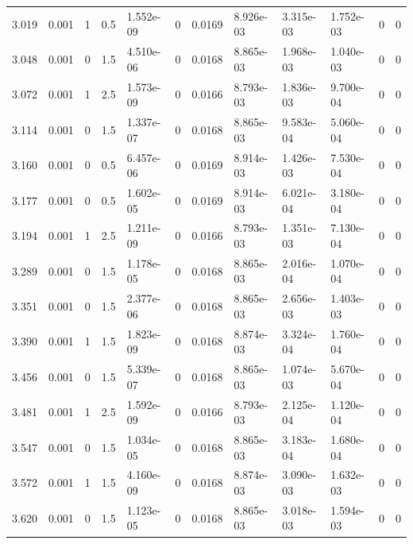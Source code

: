 \documentclass[preview]{standalone}
\begin{document}
{{{\begin{tabular}{L{1.2cm}C{1.2cm} C{0.3cm}C{0.5cm} C{1.4cm}C{1.4cm} C{1.4cm}C{1.4cm} C{1.6cm}C{1.6cm} C{1.6cm}C{1.6cm}}
  3.019  &  0.001  & 1     & 0.5 &  1.552e-09  & 0  &  0.0169&   8.926e-03& 3.315e-03 & 1.752e-03   &  0 & 0  \\ 
  3.048  &  0.001  & 0     & 1.5 &  4.510e-06  & 0  &  0.0168&   8.865e-03& 1.968e-03 & 1.040e-03   &  0 & 0  \\ 
  3.072  &  0.001  & 1     & 2.5 &  1.573e-09  & 0  &  0.0166&   8.793e-03& 1.836e-03 & 9.700e-04   &  0 & 0  \\ 
  3.114  &  0.001  & 0     & 1.5 &  1.337e-07  & 0  &  0.0168&   8.865e-03& 9.583e-04 & 5.060e-04   &  0 & 0  \\ 
  3.160  &  0.001  & 0     & 0.5 &  6.457e-06  & 0  &  0.0169&   8.914e-03& 1.426e-03 & 7.530e-04   &  0 & 0  \\ 
  3.177  &  0.001  & 0     & 0.5 &  1.602e-05  & 0  &  0.0169&   8.914e-03& 6.021e-04 & 3.180e-04   &  0 & 0  \\ 
  3.194  &  0.001  & 1     & 2.5 &  1.211e-09  & 0  &  0.0166&   8.793e-03& 1.351e-03 & 7.130e-04   &  0 & 0  \\ 
  3.289  &  0.001  & 0     & 1.5 &  1.178e-05  & 0  &  0.0168&   8.865e-03& 2.016e-04 & 1.070e-04   &  0 & 0  \\ 
  3.351  &  0.001  & 0     & 1.5 &  2.377e-06  & 0  &  0.0168&   8.865e-03& 2.656e-03 & 1.403e-03   &  0 & 0  \\ 
  3.390  &  0.001  & 1     & 1.5 &  1.823e-09  & 0  &  0.0168&   8.874e-03& 3.324e-04 & 1.760e-04   &  0 & 0  \\ 
  3.456  &  0.001  & 0     & 1.5 &  5.339e-07  & 0  &  0.0168&   8.865e-03& 1.074e-03 & 5.670e-04   &  0 & 0  \\ 
  3.481  &  0.001  & 1     & 2.5 &  1.592e-09  & 0  &  0.0166&   8.793e-03& 2.125e-04 & 1.120e-04   &  0 & 0  \\ 
  3.547  &  0.001  & 0     & 1.5 &  1.034e-05  & 0  &  0.0168&   8.865e-03& 3.183e-04 & 1.680e-04   &  0 & 0  \\ 
  3.572  &  0.001  & 1     & 1.5 &  4.160e-09  & 0  &  0.0168&   8.874e-03& 3.090e-03 & 1.632e-03   &  0 & 0  \\ 
  3.620  &  0.001  & 0     & 1.5 &  1.123e-05  & 0  &  0.0168&   8.865e-03& 3.018e-03 & 1.594e-03   &  0 & 0  \\ 
\hline 
\end{tabular} 

}}}
\end{document}
